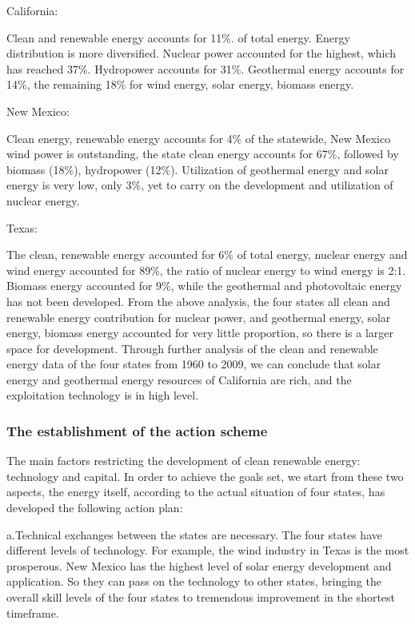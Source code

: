 California:	


Clean and renewable energy accounts for 11\%. of total energy. Energy distribution is more diversified. Nuclear power accounted for the highest, which has reached 37\%. Hydropower accounts for 31\%. Geothermal energy accounts for 14\%, the remaining 18\% for wind energy, solar energy, biomass energy.


New Mexico:


Clean energy, renewable energy accounts for 4\% of the statewide, New Mexico wind power is outstanding, the state clean energy accounts for 67\%, followed by biomass (18\%), hydropower (12\%). Utilization of geothermal energy and solar energy is very low, only 3\%, yet to carry on the development and utilization of nuclear energy.


Texas:


The clean, renewable energy accounted for 6\% of total energy, nuclear energy and wind energy accounted for 89\%, the ratio of nuclear energy to wind energy is 2:1. Biomass energy accounted for 9\%, while the geothermal and photovoltaic energy has not been developed.
From the above analysis, the four states all clean and renewable energy contribution for nuclear power, and geothermal energy, solar energy, biomass energy accounted for very little proportion, so there is a larger space for development.
Through further analysis of the clean and renewable energy data of the four states from 1960 to 2009, we can conclude that solar energy and geothermal energy resources of California are rich, and the exploitation technology is in high level.


\subsubsection{ The establishment of the action scheme}


The main factors restricting the development of clean renewable energy: technology and capital. In order to achieve the goals set, we start from these two aspects, the energy itself, according to the actual situation of four states, has developed the following action plan:


a.Technical exchanges between the states are necessary. The four states have different levels of technology. For example, the wind industry in Texas is the most prosperous. New Mexico has the highest level of solar energy development and application. So they can pass on the technology to other states, bringing the overall skill levels of the four states to tremendous improvement in the shortest timeframe.


